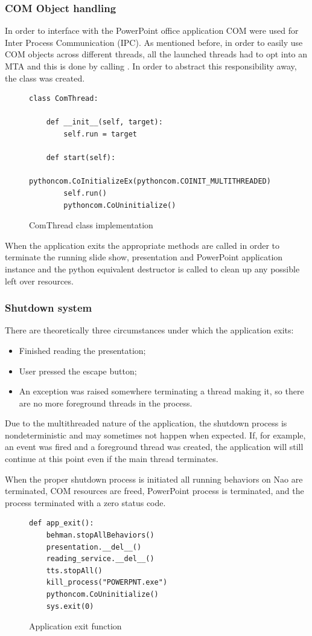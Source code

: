 \documentclass[12pt, fleqn, a4paper]{article}
\begin{document}
\subsubsection{COM Object handling}
In order to interface with the PowerPoint office application COM were used for Inter Process Communication (IPC). As mentioned before, in order to easily use COM objects across different threads, all the launched threads had to opt into an MTA and this is done 
by calling  \citep{pywin32}. In order to abstract this responsibility away, the  class was created.
\begin{figure}[H]
	\centering
	\begin{verbatim}
class ComThread:

    def __init__(self, target):
        self.run = target

    def start(self):
        pythoncom.CoInitializeEx(pythoncom.COINIT_MULTITHREADED)
        self.run()
        pythoncom.CoUninitialize()
	\end{verbatim}
	\caption{ComThread class implementation}
\end{figure}
When the application exits the appropriate methods are called in order to terminate the running slide show, presentation and PowerPoint application instance and the python equivalent destructor is called to clean up any possible left over resources.
\subsubsection{Shutdown system}
There are theoretically three circumstances under which the application exits:
\begin{itemize}
	\item Finished reading the presentation;
	\item User pressed the escape button;
	\item An exception was raised somewhere terminating a thread making it, so there are no more foreground threads in the process.
\end{itemize}
Due to the multithreaded nature of the application, the shutdown process is nondeterministic and may sometimes not happen when expected. If, for example, an event was fired and a foreground thread was created, the application will still continue at this point even if the main thread terminates.\par
When the proper shutdown process is initiated all running behaviors on Nao are terminated, COM resources are freed, PowerPoint process is terminated, and the process terminated with a zero status code.
\begin{figure}[H]
	\centering
	\begin{verbatim}
def app_exit():
    behman.stopAllBehaviors()
    presentation.__del__()
    reading_service.__del__()
    tts.stopAll()
    kill_process("POWERPNT.exe")
    pythoncom.CoUninitialize()
    sys.exit(0)
	\end{verbatim}
	\caption{Application exit function}
\end{figure}
\end{document}
